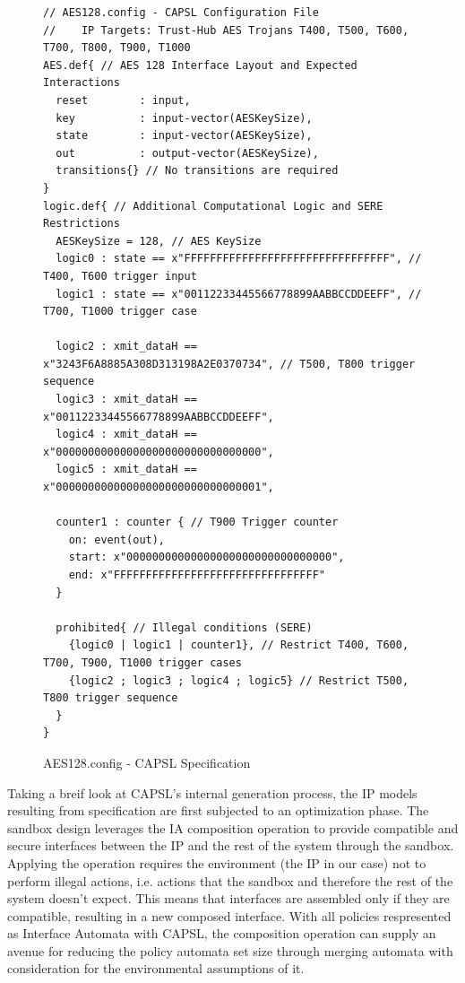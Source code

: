 \documentclass[sigconf]{acmart}
\theoremstyle{plain}
\theoremstyle{remark}
\begin{document}
\begin{figure} [t]
\begin{lstlisting}
// AES128.config - CAPSL Configuration File
//    IP Targets: Trust-Hub AES Trojans T400, T500, T600, T700, T800, T900, T1000
AES.def{ // AES 128 Interface Layout and Expected Interactions
  reset        : input,
  key          : input-vector(AESKeySize),
  state        : input-vector(AESKeySize),
  out          : output-vector(AESKeySize),
  transitions{} // No transitions are required
}
logic.def{ // Additional Computational Logic and SERE Restrictions
  AESKeySize = 128, // AES KeySize
  logic0 : state == x"FFFFFFFFFFFFFFFFFFFFFFFFFFFFFFFF", // T400, T600 trigger input
  logic1 : state == x"00112233445566778899AABBCCDDEEFF", // T700, T1000 trigger case

  logic2 : xmit_dataH == x"3243F6A8885A308D313198A2E0370734", // T500, T800 trigger sequence
  logic3 : xmit_dataH == x"00112233445566778899AABBCCDDEEFF",
  logic4 : xmit_dataH == x"00000000000000000000000000000000",
  logic5 : xmit_dataH == x"00000000000000000000000000000001",

  counter1 : counter { // T900 Trigger counter
    on: event(out),
    start: x"00000000000000000000000000000000",
    end: x"FFFFFFFFFFFFFFFFFFFFFFFFFFFFFFFF"
  }

  prohibited{ // Illegal conditions (SERE)
    {logic0 | logic1 | counter1}, // Restrict T400, T600, T700, T900, T1000 trigger cases
    {logic2 ; logic3 ; logic4 ; logic5} // Restrict T500, T800 trigger sequence
  }
}
\end{lstlisting}
\vspace*{-0.2cm}
\caption{AES128.config - CAPSL Specification}
\label{fig:AES128Spec}
\vspace*{-0.3cm}
\end{figure}

Taking a breif look at CAPSL's internal generation process, the IP models resulting from specification are first subjected to an optimization phase. The sandbox design leverages the IA composition operation to provide compatible and secure interfaces between the IP and the rest of the system through the sandbox. Applying the operation requires the environment (the IP in our case) not to perform illegal actions, i.e. actions that the sandbox and therefore the rest of the system doesn't expect. This means that interfaces are assembled only if they are compatible, resulting in a new composed interface. With all policies respresented as Interface Automata with CAPSL, the composition operation can supply an avenue for reducing the policy automata set size through merging automata with consideration for the environmental assumptions of it.
\end{document}
